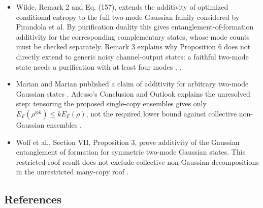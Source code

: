 \begin{itemize}
Here $E_F^{\mathrm G}$ is the restriction to Gaussian pure-state decompositions. 

  \item Wilde, Remark 2 and Eq. (157), extends the additivity of optimized conditional entropy to the full two-mode Gaussian family considered by Pirandola et al. By purification duality this gives entanglement-of-formation additivity for the corresponding complementary states, whose mode counts must be checked separately. Remark 3 explains why Proposition 6 does not directly extend to generic noisy channel-output states: a faithful two-mode state needs a purification with at least four modes , .

  \item Marian and Marian published a claim of additivity for arbitrary two-mode Gaussian states . Adesso's Conclusion and Outlook explains the unresolved step: tensoring the proposed single-copy ensembles gives only $E_F(\rho^{\otimes k})\leq kE_F(\rho)$, not the required lower bound against collective non-Gaussian ensembles .

  \item Wolf et al., Section VII, Proposition 3, prove additivity of the Gaussian entanglement of formation for symmetric two-mode Gaussian states. This restricted-roof result does not exclude collective non-Gaussian decompositions in the unrestricted many-copy roof .
\end{itemize}

\subsection*{References}

